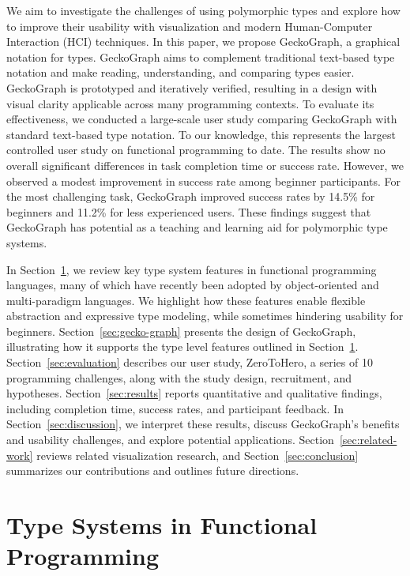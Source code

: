 \documentclass[preprint,12pt]{elsarticle}
\begin{document}
 We aim to investigate the challenges of using polymorphic types and explore how to improve their usability with visualization and modern Human-Computer Interaction (HCI) techniques. In this paper, we propose GeckoGraph, a graphical notation for types. GeckoGraph aims to complement traditional text-based type notation and make reading, understanding, and comparing types easier. GeckoGraph is prototyped and iteratively verified, resulting in a design with visual clarity applicable across many programming contexts. 
 To evaluate its effectiveness, we conducted a large-scale user study comparing GeckoGraph with standard text-based type notation. To our knowledge, this represents the largest controlled user study on functional programming to date.
The results show no overall significant differences in task completion time or success rate. However, we observed a modest improvement in success rate among beginner participants. For the most challenging task, GeckoGraph improved success rates by 14.5\% for beginners and 11.2\% for less experienced users. These findings suggest that GeckoGraph has potential as a teaching and learning aid for polymorphic type systems.

In Section~\ref{sec:type-systems}, we review key type system features in functional programming languages, many of which have recently been adopted by object-oriented and multi-paradigm languages. We highlight how these features enable flexible abstraction and expressive type modeling, while sometimes hindering usability for beginners. Section~\ref{sec:gecko-graph} presents the design of GeckoGraph, illustrating how it supports the type level features outlined in Section~\ref{sec:type-systems}. Section~\ref{sec:evaluation} describes our user study, ZeroToHero, a series of 10 programming challenges, along with the study design, recruitment, and hypotheses. Section~\ref{sec:results} reports quantitative and qualitative findings, including completion time, success rates, and participant feedback. In Section~\ref{sec:discussion}, we interpret these results, discuss GeckoGraph’s benefits and usability challenges, and explore potential applications. Section~\ref{sec:related-work} reviews related visualization research, and Section~\ref{sec:conclusion} summarizes our contributions and outlines future directions.

\section{Type Systems in Functional Programming} \label{sec:type-systems}
\end{document}
